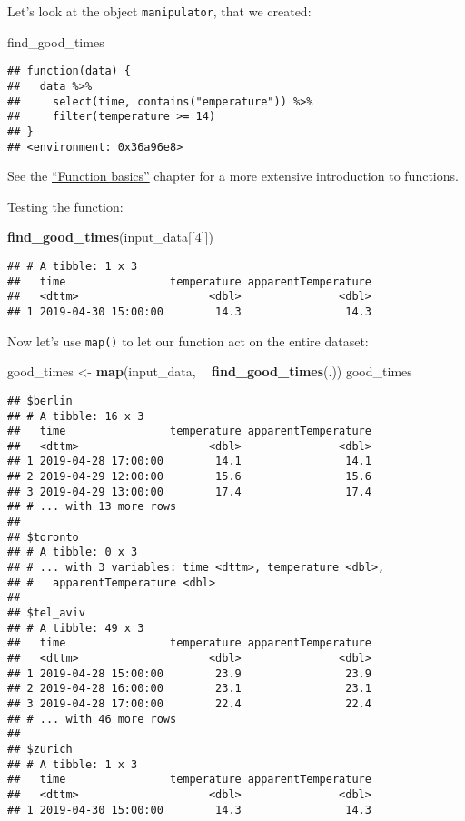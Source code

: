 \documentclass[]{book}
\newenvironment{Shaded}{\begin{snugshade}}{\end{snugshade}}
\newcommand{\DecValTok}[1]{\textcolor[rgb]{0.00,0.00,0.81}{#1}}
\newcommand{\KeywordTok}[1]{\textcolor[rgb]{0.13,0.29,0.53}{\textbf{#1}}}
\newcommand{\NormalTok}[1]{#1}
\newcommand{\OperatorTok}[1]{\textcolor[rgb]{0.81,0.36,0.00}{\textbf{#1}}}
\newcommand{\StringTok}[1]{\textcolor[rgb]{0.31,0.60,0.02}{#1}}
\begin{document}
Let's look at the object \texttt{manipulator}, that we created:

\begin{Shaded}
\begin{Highlighting}[]
\NormalTok{find_good_times}
\end{Highlighting}
\end{Shaded}

\begin{verbatim}
## function(data) {
##   data %>%
##     select(time, contains("emperature")) %>%
##     filter(temperature >= 14)
## }
## <environment: 0x36a96e8>
\end{verbatim}

See the \protect\hyperlink{function-basics}{``Function basics''} chapter for a more extensive introduction to functions.

Testing the function:

\begin{Shaded}
\begin{Highlighting}[]
\KeywordTok{find_good_times}\NormalTok{(input_data[[}\DecValTok{4}\NormalTok{]])}
\end{Highlighting}
\end{Shaded}

\begin{verbatim}
## # A tibble: 1 x 3
##   time                temperature apparentTemperature
##   <dttm>                    <dbl>               <dbl>
## 1 2019-04-30 15:00:00        14.3                14.3
\end{verbatim}

Now let's use \texttt{map()} to let our function act on the entire dataset:

\begin{Shaded}
\begin{Highlighting}[]
\NormalTok{good_times <-}\StringTok{ }\KeywordTok{map}\NormalTok{(input_data, }\OperatorTok{~}\StringTok{ }\KeywordTok{find_good_times}\NormalTok{(.))}
\NormalTok{good_times}
\end{Highlighting}
\end{Shaded}

\begin{verbatim}
## $berlin
## # A tibble: 16 x 3
##   time                temperature apparentTemperature
##   <dttm>                    <dbl>               <dbl>
## 1 2019-04-28 17:00:00        14.1                14.1
## 2 2019-04-29 12:00:00        15.6                15.6
## 3 2019-04-29 13:00:00        17.4                17.4
## # ... with 13 more rows
## 
## $toronto
## # A tibble: 0 x 3
## # ... with 3 variables: time <dttm>, temperature <dbl>,
## #   apparentTemperature <dbl>
## 
## $tel_aviv
## # A tibble: 49 x 3
##   time                temperature apparentTemperature
##   <dttm>                    <dbl>               <dbl>
## 1 2019-04-28 15:00:00        23.9                23.9
## 2 2019-04-28 16:00:00        23.1                23.1
## 3 2019-04-28 17:00:00        22.4                22.4
## # ... with 46 more rows
## 
## $zurich
## # A tibble: 1 x 3
##   time                temperature apparentTemperature
##   <dttm>                    <dbl>               <dbl>
## 1 2019-04-30 15:00:00        14.3                14.3
\end{verbatim}
\end{document}
